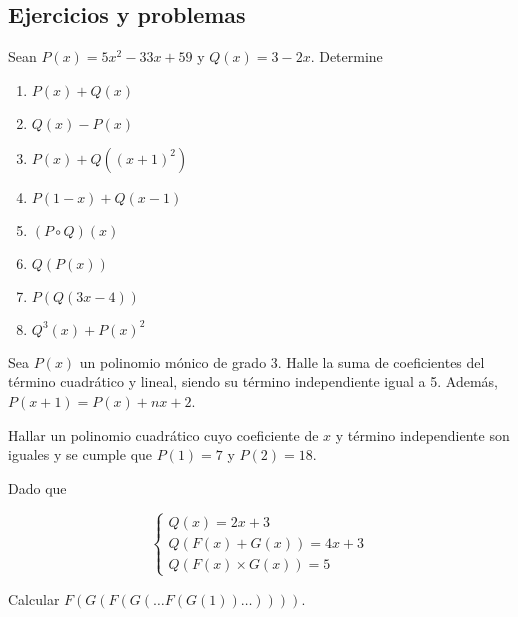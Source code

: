 \subsection{Ejercicios y problemas}

\begin{section-exercise}
    Sean $P(x) = 5x^2 - 33x + 59$ y $Q(x) = 3 - 2x$.
    Determine
    \begin{multicols}{2}
        \begin{enumerate}
            \item $P(x) + Q(x)$
            \item $Q(x) - P(x)$
            \item $P(x) + Q((x+1)^2)$
            \item $P(1-x) + Q(x-1)$
            \item $(P\circ Q)(x)$
            \item $Q(P(x))$
            \item $P(Q(3x - 4))$
            \item $Q^3(x) + P(x)^2$
        \end{enumerate}
    \end{multicols}
\end{section-exercise}

\begin{section-problem}
    Sea $P(x)$ un polinomio mónico de grado 3.
    Halle la suma de coeficientes del término cuadrático y lineal, siendo su término independiente igual a 5.
    Además, $P(x + 1) = P(x) + nx + 2$.
\end{section-problem}

\begin{section-problem}
    Hallar un polinomio cuadrático cuyo coeficiente de $x$ y término independiente son iguales y se cumple que $P(1) = 7$ y $P(2) = 18$.
\end{section-problem}

\begin{section-problem}
    Dado que

    \[
        \begin{cases}
            Q(x) = 2x + 3 \\
            Q( F(x) + G(x) ) = 4x + 3 \\
            Q( F(x) \times G(x) ) = 5
        \end{cases}
    \]

    Calcular $F(G(F(G(\dots F(G(1))\dots))))$.
\end{section-problem}